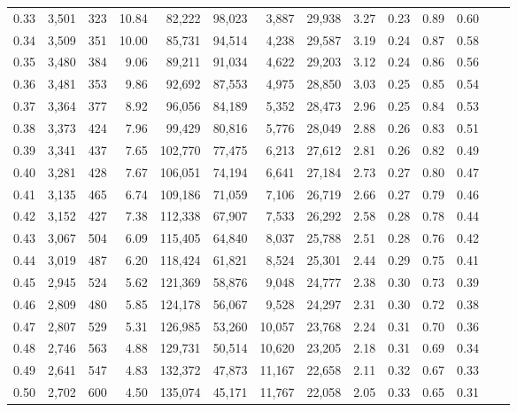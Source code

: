 \begin{tabular}{rrrrrrrrrrrrrr}
0.33 &  3,501 &  323 &   10.84 &   82,222 &   98,023 &   3,887 &  29,938 &  3.27 &  0.23 &  0.89 &      0.60 \\
0.34 &  3,509 &  351 &   10.00 &   85,731 &   94,514 &   4,238 &  29,587 &  3.19 &  0.24 &  0.87 &      0.58 \\
0.35 &  3,480 &  384 &    9.06 &   89,211 &   91,034 &   4,622 &  29,203 &  3.12 &  0.24 &  0.86 &      0.56 \\
0.36 &  3,481 &  353 &    9.86 &   92,692 &   87,553 &   4,975 &  28,850 &  3.03 &  0.25 &  0.85 &      0.54 \\
0.37 &  3,364 &  377 &    8.92 &   96,056 &   84,189 &   5,352 &  28,473 &  2.96 &  0.25 &  0.84 &      0.53 \\
0.38 &  3,373 &  424 &    7.96 &   99,429 &   80,816 &   5,776 &  28,049 &  2.88 &  0.26 &  0.83 &      0.51 \\
0.39 &  3,341 &  437 &    7.65 &  102,770 &   77,475 &   6,213 &  27,612 &  2.81 &  0.26 &  0.82 &      0.49 \\
0.40 &  3,281 &  428 &    7.67 &  106,051 &   74,194 &   6,641 &  27,184 &  2.73 &  0.27 &  0.80 &      0.47 \\
0.41 &  3,135 &  465 &    6.74 &  109,186 &   71,059 &   7,106 &  26,719 &  2.66 &  0.27 &  0.79 &      0.46 \\
0.42 &  3,152 &  427 &    7.38 &  112,338 &   67,907 &   7,533 &  26,292 &  2.58 &  0.28 &  0.78 &      0.44 \\
0.43 &  3,067 &  504 &    6.09 &  115,405 &   64,840 &   8,037 &  25,788 &  2.51 &  0.28 &  0.76 &      0.42 \\
0.44 &  3,019 &  487 &    6.20 &  118,424 &   61,821 &   8,524 &  25,301 &  2.44 &  0.29 &  0.75 &      0.41 \\
0.45 &  2,945 &  524 &    5.62 &  121,369 &   58,876 &   9,048 &  24,777 &  2.38 &  0.30 &  0.73 &      0.39 \\
0.46 &  2,809 &  480 &    5.85 &  124,178 &   56,067 &   9,528 &  24,297 &  2.31 &  0.30 &  0.72 &      0.38 \\
0.47 &  2,807 &  529 &    5.31 &  126,985 &   53,260 &  10,057 &  23,768 &  2.24 &  0.31 &  0.70 &      0.36 \\
0.48 &  2,746 &  563 &    4.88 &  129,731 &   50,514 &  10,620 &  23,205 &  2.18 &  0.31 &  0.69 &      0.34 \\
0.49 &  2,641 &  547 &    4.83 &  132,372 &   47,873 &  11,167 &  22,658 &  2.11 &  0.32 &  0.67 &      0.33 \\
0.50 &  2,702 &  600 &    4.50 &  135,074 &   45,171 &  11,767 &  22,058 &  2.05 &  0.33 &  0.65 &      0.31 \\

\end{tabular}
